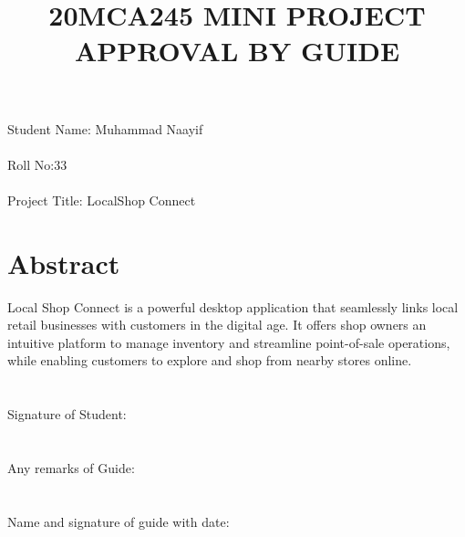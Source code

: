 \documentclass[a4paper]{article}
\title{20MCA245 MINI PROJECT\\APPROVAL BY GUIDE}
\date{}
\author{}
\begin{document}
\maketitle
\section*{}
Student Name: Muhammad Naayif\\\\Roll No:33\\\\Project Title: LocalShop Connect

\section*{Abstract}
Local Shop Connect is a powerful desktop application that seamlessly links local retail businesses with customers in the digital age. It offers shop owners an intuitive platform to manage inventory and streamline point-of-sale operations, while enabling customers to explore and shop from nearby stores online.
\section*{}
Signature of Student:\\\\\\Any remarks of Guide:\\\\\\Name and signature of guide with date: 
\end{document}
